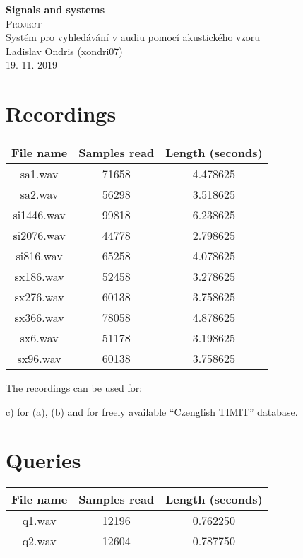 \documentclass[11pt]{article}
\begin{document}
\begin{titlepage}
\center


\textbf{\Huge{Signals and systems}}
\\[4.0cm]

\textsc{\Huge {Project}}
\\[0.2cm]

\Large {Systém pro vyhledávání v audiu pomocí akustického vzoru}
\\[3.0cm]

\Large{Ladislav Ondris (xondri07)}
\\[0.7cm]
\Large{19. 11. 2019}

\end{titlepage}

\newpage

\section{Recordings}
\par

\begin{center}
\begin{tabular}{ |c|c|c| } 
 \hline
 File name & Samples read & Length (seconds) \\ 
 \hline
 sa1.wav &  71658 & 4.478625 \\ 
 sa2.wav & 56298 & 3.518625 \\ 
 si1446.wav & 99818 & 6.238625 \\ 
 si2076.wav & 44778 & 2.798625 \\ 
 si816.wav & 65258 & 4.078625 \\ 
 sx186.wav & 52458 & 3.278625 \\ 
 sx276.wav & 60138 & 3.758625 \\ 
 sx366.wav & 78058 & 4.878625 \\ 
 sx6.wav & 51178 &  3.198625 \\ 
 sx96.wav & 60138 & 3.758625 \\ 
 \hline
\end{tabular}
\end{center}
\par 
The recordings can be used for: 
\par
c) for (a), (b) and for freely available “Czenglish TIMIT” database. 

\section{Queries}
\begin{center}
\begin{tabular}{ |c|c|c| } 
 \hline
 File name & Samples read & Length (seconds) \\ 
 \hline
 q1.wav &  12196 & 0.762250 \\ 
 q2.wav & 12604 & 0.787750 \\ 
 \hline
\end{tabular}
\end{center}
\end{document}
